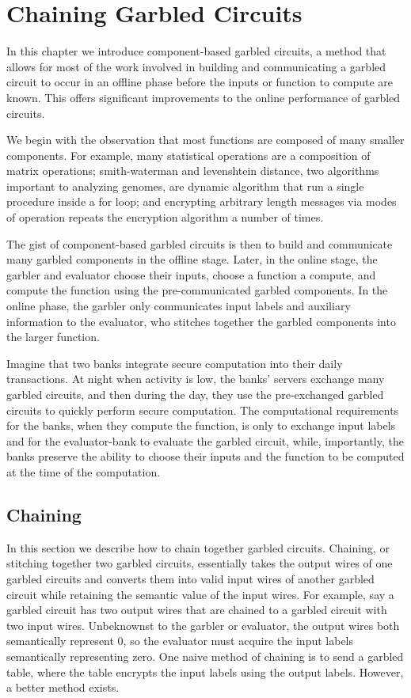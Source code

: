 
\chapter{Chaining Garbled Circuits}

In this chapter we introduce component-based garbled circuits, a method that allows for most of the work involved in building and communicating a garbled circuit to occur in an offline phase before the inputs or function to compute are known. 
This offers significant improvements to the online performance of garbled circuits. 

We begin with the observation that most functions are composed of many smaller components. 
For example, many statistical operations are a composition of matrix operations; smith-waterman and levenshtein distance, two algorithms important to analyzing genomes, are dynamic algorithm that run a single procedure inside a for loop; and encrypting arbitrary length messages via modes of operation repeats the encryption algorithm a number of times.

The gist of component-based garbled circuits is then to build and communicate many garbled components in the offline stage.
Later, in the online stage, the garbler and evaluator choose their inputs, choose a function a compute, and compute the function using the pre-communicated garbled components.
In the online phase, the garbler only communicates input labels and auxiliary information to the evaluator, who stitches together the garbled components into the larger function.

Imagine that two banks integrate secure computation into their daily transactions.
At night when activity is low, the banks' servers exchange many garbled circuits, and then during the day, they use the pre-exchanged garbled circuits to quickly perform secure computation.
The computational requirements for the banks, when they compute the function, is only to exchange input labels and for the evaluator-bank to evaluate the garbled circuit, while, importantly, the banks preserve the ability to choose their inputs and the function to be computed at the time of the computation. 

\section{Chaining}

In this section we describe how to chain together garbled circuits.
Chaining, or stitching together two garbled circuits, essentially takes the output wires of one garbled circuits and converts them into valid input wires of another garbled circuit while retaining the semantic value of the input wires.
For example, say a garbled circuit has two output wires that are chained to a garbled circuit with two input wires.
Unbeknownst to the garbler or evaluator, the output wires both semantically represent 0, so the evaluator must acquire the input labels semantically representing zero.
One naive method of chaining is to send a garbled table, where the table encrypts the input labels using the output labels.
However, a better method exists.


